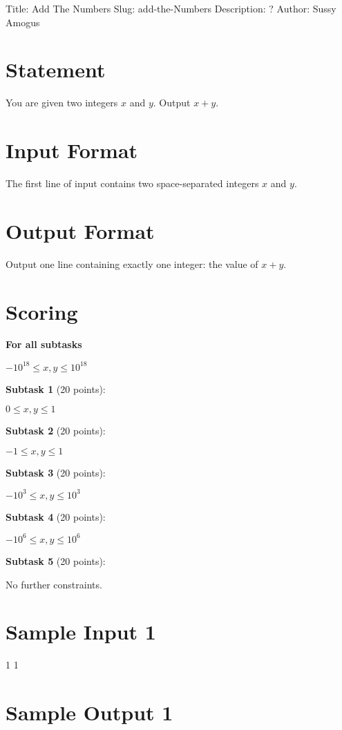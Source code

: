 Title: Add The Numbers
Slug: add-the-Numbers
Description: ?
Author: Sussy Amogus

\section{Statement}

You are given two integers $x$ and $y$. Output $x + y$.


\section{Input Format}

The first line of input contains two space-separated integers $x$ and $y$.


\section{Output Format}

Output one line containing exactly one integer: the value of $x + y$.


\section{Scoring}

\textbf{For all subtasks}

$-10^{18} \le x, y \le 10^{18}$

\textbf{Subtask 1} (20 points):

$0 \le x, y \le 1$

\textbf{Subtask 2} (20 points):

$-1 \le x, y \le 1$

\textbf{Subtask 3} (20 points):

$-10^3 \le x, y \le 10^3$

\textbf{Subtask 4} (20 points):

$-10^6 \le x, y \le 10^6$

\textbf{Subtask 5} (20 points):

No further constraints.


\section{Sample Input 1}

    1
    1

\section{Sample Output 1}


